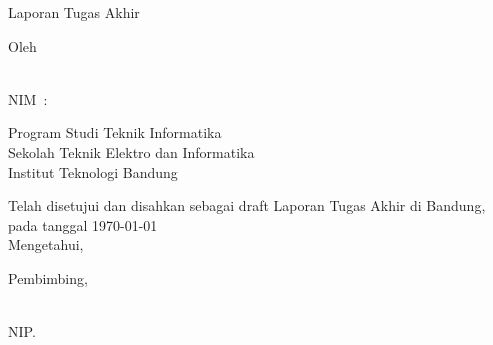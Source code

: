 
\begin{center}
  \smallskip
  \thispagestyle{empty}
  \Large \bfseries \MakeUppercase{\thesistitle}
  \vfill

  \normalsize Laporan Tugas Akhir
  \vfill

  \large Oleh
  
  \large \uppercase{\theauthor} \\
  \large NIM~:~\uppercase{\nim}

  \vfill

  \normalfont{}
  \normalsize Program Studi Teknik Informatika \\
  \normalsize Sekolah Teknik Elektro dan Informatika \\
  \normalsize Institut Teknologi Bandung \\
  \vfill

  \normalsize Telah disetujui dan disahkan sebagai draft Laporan Tugas Akhir di Bandung, pada tanggal \today \\
  \normalsize Mengetahui, \\
  \vfill

  Pembimbing,
  \vfill

  \underline{\supervisor{}} \\
  NIP.\@ \uppercase{\supervisornip{}} \\
  
\end{center}